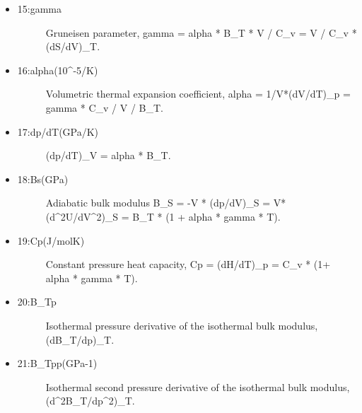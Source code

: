 \documentclass[a4paper]{article}
\begin{document}
\begin{itemize}
\begin{description}
\end{description}

\item 
\begin{description}
\item[{15:gamma}] \leavevmode 
Gruneisen parameter, gamma = alpha * B\_T * V / C\_v =
V / C\_v * (dS/dV)\_T.

\end{description}

\item 
\begin{description}
\item[{16:alpha(10\textasciicircum{}-5/K)}] \leavevmode 
Volumetric thermal expansion coefficient, alpha = 1/V*(dV/dT)\_p =
gamma * C\_v / V / B\_T.

\end{description}

\item 
\begin{description}
\item[{17:dp/dT(GPa/K)}] \leavevmode 
(dp/dT)\_V = alpha * B\_T.

\end{description}

\item 
\begin{description}
\item[{18:Bs(GPa)}] \leavevmode 
Adiabatic bulk modulus B\_S = -V * (dp/dV)\_S = V*(d\textasciicircum{}2U/dV\textasciicircum{}2)\_S =
B\_T * (1 + alpha * gamma * T).

\end{description}

\item 
\begin{description}
\item[{19:Cp(J/molK)}] \leavevmode 
Constant pressure heat capacity, Cp = (dH/dT)\_p =
C\_v * (1+ alpha * gamma * T).

\end{description}

\item 
\begin{description}
\item[{20:B\_Tp}] \leavevmode 
Isothermal pressure derivative of the isothermal bulk modulus,
(dB\_T/dp)\_T.

\end{description}

\item 
\begin{description}
\item[{21:B\_Tpp(GPa-1)}] \leavevmode 
Isothermal second pressure derivative of the isothermal bulk
modulus, (d\textasciicircum{}2B\_T/dp\textasciicircum{}2)\_T.


\end{description}
\end{itemize}
\end{document}

